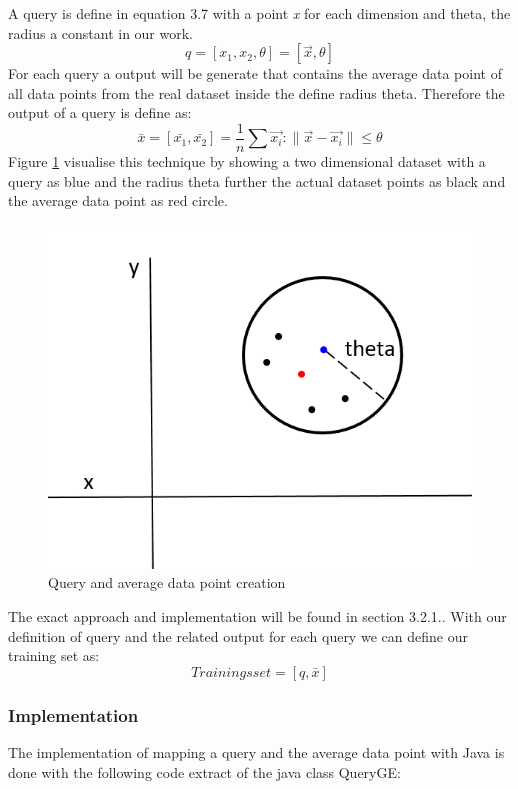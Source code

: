 \documentclass{lmproj}
\begin{document}
A query is define in equation 3.7 with a point \textit{x} for each dimension and theta, the radius a constant in our work.  
\begin{equation}
q=[x_1,x_2,\theta] =[\vec{x},\theta]
\end{equation}
For each query a output will be generate that contains the average data point of all data points from the real dataset inside the define radius theta. Therefore the output of a query is define as:
\begin{equation}
\bar{x}=[\bar{x_1},\bar{x_2}]=\frac{1}{n}\sum \vec{x_i}:\parallel \vec{x}-\vec{x_i}\parallel \leq \theta
\end{equation}
Figure \ref{fig:Query} visualise this technique by showing a two dimensional dataset with a query as blue and the radius theta further the actual dataset points as black and the average data point as red circle.
 \begin{figure}[ht]
	\centering
	\includegraphics[width=0.6\linewidth]{Query.PNG}
	\caption[Query]{Query and average data point creation}
	\label{fig:Query}
\end{figure}

The exact approach and implementation will be found in section 3.2.1.. With our definition of query and the related output for each query we can define our training set as:
\begin{equation}
Trainingsset=[q,\bar{x}]
\end{equation}

\subsubsection{Implementation}

The implementation of mapping a query and the average data point with Java is done with the following code extract of the java class QueryGE:


\end{document}
